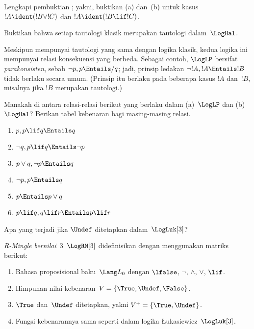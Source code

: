 \documentclass[../../../include/open-logic-section]{subfiles}
\begin{document}
\begin{prob}
  Lengkapi pembuktian ; yakni,
  buktikan (a) dan~(b) untuk kasus $!A\ident(!B\lor !C)$ dan
  $!A\ident(!B\lif !C)$.
\end{prob}

\begin{prob}
Buktikan bahwa setiap tautologi klasik merupakan tautologi dalam~$\LogHal$.
\end{prob}

Meskipun mempunyai tautologi yang sama dengan logika klasik, kedua logika ini
mempunyai relasi konsekuensi yang berbeda. Sebagai contoh, $\LogLP$ bersifat
\emph{parakonsisten}, sebab $\lnot p,p\Entails/ q$; jadi, prinsip ledakan
$\lnot !A,!A\Entails !B$ tidak berlaku secara umum. (Prinsip itu berlaku pada
beberapa kasus $!A$ dan~$!B$, misalnya jika $!B$ merupakan tautologi.)

\begin{prob}
  Manakah di antara relasi-relasi berikut yang berlaku dalam (a)~$\LogLP$ dan
  (b)~$\LogHal$? Berikan tabel kebenaran bagi masing-masing relasi.
  \begin{enumerate}
    \item $p,p\lif q\Entails q$
    \item $\lnot q,p\lif q\Entails\lnot p$
    \item $p\lor q,\lnot p\Entails q$
    \item $\lnot p,p\Entails q$
    \item $p\Entails p\lor q$
    \item $p\lif q,q\lif r\Entails p\lif r$
  \end{enumerate}
\end{prob}

Apa yang terjadi jika $\Undef$ ditetapkan dalam~$\LogLuk[3]$?

\begin{defn}
  \emph{R-Mingle bernilai~$3$}~$\LogRM[3]$ didefinisikan dengan menggunakan
  matriks berikut:
  \begin{enumerate}
    \item Bahasa proposisional baku~$\Lang L_0$ dengan $\lfalse$, $\lnot$,
    $\land$, $\lor$, $\lif$.
    \item Himpunan nilai kebenaran~$V=\{\True,\Undef,\False\}$.
    \item $\True$ dan~$\Undef$ ditetapkan, yakni
    $V^+=\{\True,\Undef\}$.
    \item Fungsi kebenarannya sama seperti dalam logika
    \L ukasiewicz~$\LogLuk[3]$.
  \end{enumerate}
\end{defn}
\end{document}
